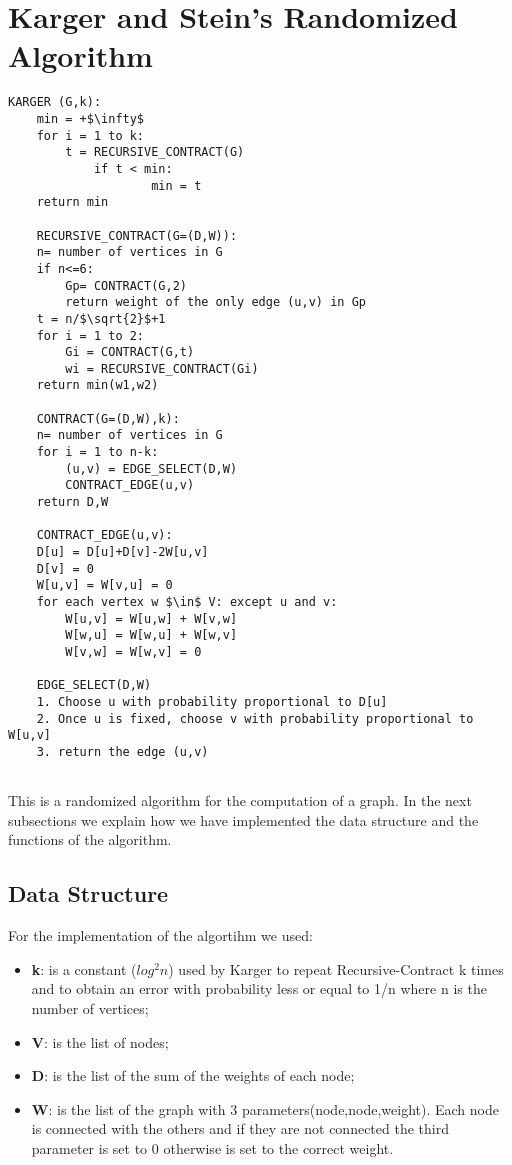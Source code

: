 \section{Karger and Stein's Randomized Algorithm}\label{karger}

\begin{lstlisting}[mathescape=true]
	KARGER (G,k):
	min = +$\infty$
	for i = 1 to k:		
		t = RECURSIVE_CONTRACT(G)		
			if t < min:
					min = t
	return min
	
	RECURSIVE_CONTRACT(G=(D,W)):
	n= number of vertices in G
	if n<=6:
		Gp= CONTRACT(G,2)
		return weight of the only edge (u,v) in Gp
	t = n/$\sqrt{2}$+1
	for i = 1 to 2:
		Gi = CONTRACT(G,t)
		wi = RECURSIVE_CONTRACT(Gi)
	return min(w1,w2)
	
	CONTRACT(G=(D,W),k):
	n= number of vertices in G
	for i = 1 to n-k:
		(u,v) = EDGE_SELECT(D,W)
		CONTRACT_EDGE(u,v)
	return D,W
	
	CONTRACT_EDGE(u,v):
	D[u] = D[u]+D[v]-2W[u,v]
	D[v] = 0
	W[u,v] = W[v,u] = 0
	for each vertex w $\in$ V: except u and v:
		W[u,v] = W[u,w] + W[v,w]
		W[w,u] = W[w,u] + W[w,v]
		W[v,w] = W[w,v] = 0
		
	EDGE_SELECT(D,W)
	1. Choose u with probability proportional to D[u]
	2. Once u is fixed, choose v with probability proportional to W[u,v]
	3. return the edge (u,v)
	
\end{lstlisting}

This is a randomized algorithm for the computation of a graph.
In the next subsections we explain how we have implemented the data structure and the functions of the algorithm.

\pagebreak

\subsection{Data Structure}
For the implementation of the algortihm we used:
\begin{itemize}
	\item  \textbf{k}: is a constant ($log^2n$) used by Karger to repeat Recursive-Contract k times and to obtain an error with probability less or equal to 1/n where n is the number of vertices;
	\item  \textbf{V}: is the list of nodes;
	\item  \textbf{D}: is the list of the sum of the weights of each node;
	\item  \textbf{W}: is the list of the graph with 3 parameters(node,node,weight). Each node is connected with the others and if they are not connected the third parameter is set to 0 otherwise is set to the correct weight.
\end{itemize}


